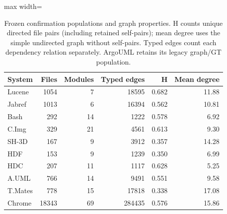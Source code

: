 \begin{table}[t]
\centering\small
\caption{Frozen confirmation populations and graph properties. H counts unique directed file pairs (including retained self-pairs); mean degree uses the simple undirected graph without self-pairs. Typed edges count each dependency relation separately. ArgoUML retains its legacy graph/GT population.\label{tab:confirmation_graphs}}
\begin{adjustbox}{max width=\columnwidth}
\begin{tabular}{lrrrrr}
\toprule
System & Files & Modules & Typed edges & H & Mean degree \\
\midrule
Lucene & 1054 & 7 & 18595 & 0.682 & 11.88 \\
Jabref & 1013 & 6 & 16394 & 0.562 & 10.81 \\
Bash & 292 & 14 & 1222 & 0.578 & 6.92 \\
C.Img & 329 & 21 & 4561 & 0.613 & 9.30 \\
SH-3D & 167 & 9 & 3912 & 0.357 & 14.28 \\
HDF & 153 & 9 & 1239 & 0.350 & 6.99 \\
HDC & 207 & 11 & 1117 & 0.628 & 5.25 \\
A.UML & 766 & 14 & 9491 & 0.551 & 9.58 \\
T.Mates & 778 & 15 & 17818 & 0.338 & 17.08 \\
Chrome & 18343 & 69 & 284435 & 0.576 & 15.86 \\
\bottomrule
\end{tabular}
\end{adjustbox}
\end{table}
